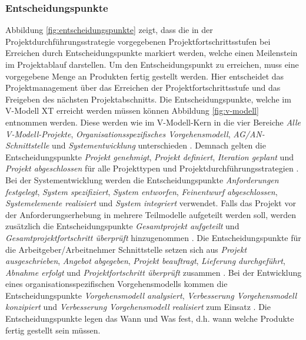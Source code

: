  \subsubsection{Entscheidungspunkte}
Abbildung \ref{fig:entscheidungspunkte} zeigt, dass die in der Projektdurchführungsstrategie vorgegebenen Projektfortschrittsstufen bei Erreichen durch Entscheidungspunkte markiert werden, welche einen Meilenstein im Projektablauf darstellen. Um den Entscheidungspunkt zu erreichen, muss eine vorgegebene Menge an Produkten fertig gestellt werden. Hier entscheidet das Projektmanagement über das Erreichen der Projektfortschrittsstufe und das Freigeben des nächsten Projektabschnitts. Die Entscheidungspunkte, welche im V-Modell XT erreicht werden müssen können Abbildung \ref{fig:v-modell} entnommen werden. Diese werden wie im V-Modell-Kern in die vier Bereiche \textit{Alle V-Modell-Projekte}, \textit{Organisationsspezifisches Vorgehensmodell}, \textit{AG/AN-Schnittstelle} und \textit{Systementwicklung} unterschieden \cite{2004vmodell}. \newline
Demnach gelten die Entscheidungspunkte \textit{Projekt genehmigt}, \textit{Projekt definiert}, \textit{Iteration geplant} und \textit{Projekt abgeschlossen} für alle Projekttypen und Projektdurchführungsstrategien \cite{2004vmodell}. \newline
Bei der Systementwicklung werden die Entscheidungspunkte \textit{Anforderungen festgelegt}, \textit{System spezifiziert}, \textit{System entworfen}, \textit{Feinentwurf abgeschlossen}, \textit{Systemelemente realisiert} und \textit{System integriert} verwendet. Falls das Projekt vor der Anforderungserhebung in mehrere Teilmodelle aufgeteilt werden soll, werden zusätzlich die Entscheidungspunkte \textit{Gesamtprojekt aufgeteilt} und \textit{Gesamtprojektfortschritt überprüft} hinzugenommen \cite{2004vmodell}. \newline
Die Entscheidungspunkte für die Arbeitgeber/Arbeitnehmer Schnittstelle setzen sich aus \textit{Projekt ausgeschrieben}, \textit{Angebot abgegeben}, \textit{Projekt beauftragt}, \textit{Lieferung durchgeführt}, \textit{Abnahme erfolgt} und \textit{Projektfortschritt überprüft} zusammen \cite{2004vmodell}. \newline
 Bei der Entwicklung eines organisationsspezifischen Vorgehensmodells kommen die Entscheidungspunkte \textit{Vorgehensmodell analysiert}, \textit{Verbesserung Vorgehensmodell konzipiert} und \textit{Verbesserung Vorgehensmodell realisiert} zum Einsatz \cite{2004vmodell}. \newline
 Die Entscheidungspunkte legen das \grqq Wann\grqq {} und \grqq Was\grqq {} fest, d.h. wann welche Produkte fertig gestellt sein müssen.

